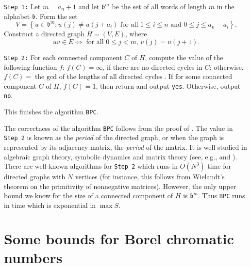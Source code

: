 \documentclass[11pt]{amsart}
\theoremstyle{definition}
\def\bsft{\mathfrak{b}}
\begin{document}
{\tt Step 1:} Let $m=a_n+1$ and let $\bsft^m$ be the set of all words of length $m$ in the alphabet $\bsft$. Form the set
$$ V=\left\{ u\in \bsft^m\colon u(j)\neq u(j+a_i) \mbox{ for all $1\leq i\leq n$ and $0\leq j\leq a_n-a_i$}\right\}. $$
Construct a directed graph $H=(V, E)$, where
$$ uv\in E\iff \mbox{ for all $0\leq j<m$, $v(j)=u(j+1)$.} $$

{\tt Step 2:} For each connected component $C$ of $H$, compute the  value of the following function $f$:
$f(C)=\infty$, if there are no directed cycles in $C$; otherwise, $f(C)=\mbox{the $\gcd$ of the lengths of all directed cycles}$. 
 If for some connected component $C$ of $H$, $f(C)=1$, then return and output {\tt yes}. Otherwise, output {\tt no}.

This finishes the algorithm {\tt BPC}.

The correctness of the algorithm {\tt BPC} follows from the proof of \cite[Theorem 4.2.1]{GJKS}. The value in {\tt Step 2} is known as the {\em period} of the directed graph, or when the graph is represented by its adjacency matrix, the {\em period} of the matrix. It is well studied in algebraic graph theory, symbolic dynamics and matrix theory (see, e.g., \cite[Section 4.5]{LindBook} and \cite[Section 8.5]{HornBook}). There are well-known algorithms for {\tt Step 2} which runs in $O(N^3)$ time for directed graphs with $N$ vertices (for instance, this follows from Wielandt's theorem \cite[Corollary 8.5.8]{HornBook} on the primitivity of nonnegative matrices). However, the only upper bound we know for the size of a connected component of $H$ is $\bsft^m$. Thus {\tt BPC} runs in time which is exponential in $\max S$.
































\section{Some bounds for Borel chromatic numbers}\label{sec:5}
\end{document}
